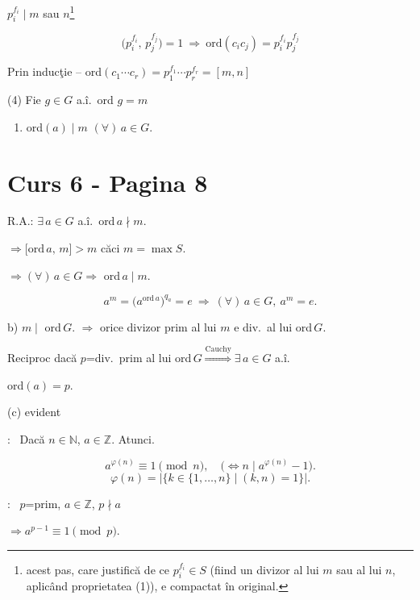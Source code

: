 \bigskip
\noindent $p_i^{f_i}\mid m$ sau $n$\footnote{acest pas, care justifică de ce $p_i^{f_i}\in S$ (fiind un divizor al lui $m$ sau al lui $n$, aplicând proprietatea (1)), e compactat în original.}

\[
\big(p_i^{f_i},\,p_j^{f_j}\big)=1 \ \Rightarrow \ \text{ord}(c_ic_j) = p_i^{f_i}p_j^{f_j}
\]

\bigskip
\noindent Prin inducţie -- ord$(c_1\cdots c_r) = p_1^{f_1}\cdots p_r^{f_r} = [m,n]$

\bigskip
\noindent (4) Fie $g\in G$ a.î.\ ord $g=m$

\begin{enumerate}
\item[(a)] ord$(a)\mid m$ $(\forall)\,a\in G$.
\end{enumerate}




\section*{Curs 6 - Pagina 8}

\noindent R.A.: $\exists\,a\in G$ a.î.\ ord$\,a\nmid m$.

\noindent $\Rightarrow \big[\text{ord}\,a,\,m\big] > m$ \quad căci $m=\max S$.

\bigskip
\noindent $\Rightarrow (\forall)\,a\in G \Rightarrow$ ord$\,a\mid m$.

\[
a^m = \big(a^{\text{ord}\,a}\big)^{q_a} = e \ \Rightarrow \ (\forall)\,a\in G,\ a^m=e.
\]

\bigskip
\noindent b) $m\mid$ ord$\,G$. $\Rightarrow$ orice divizor prim al lui $m$ e div.\ al lui ord$\,G$.

\noindent Reciproc dacă $p$=div.\ prim al lui ord$\,G \overset{\text{Cauchy}}{\Longrightarrow} \exists\,a\in G$ a.î.

\noindent ord$(a)=p$.

\bigskip
\noindent (c) evident

\bigskip
\noindent{}: \ Dacă $n\in\mathbb{N}$, $a\in\mathbb{Z}$. Atunci.

\[
a^{\varphi(n)} \equiv 1 \pmod n, \quad \big(\Leftrightarrow n\mid a^{\varphi(n)}-1\big).
\]
\[
\varphi(n) = \big|\{k\in\{1,\ldots,n\} \mid (k,n)=1\}\big|.
\]

\bigskip
\noindent{}: \ $p$=prim, $a\in\mathbb{Z}$, $p\nmid a$

\noindent $\Rightarrow a^{p-1}\equiv 1 \pmod p$.

